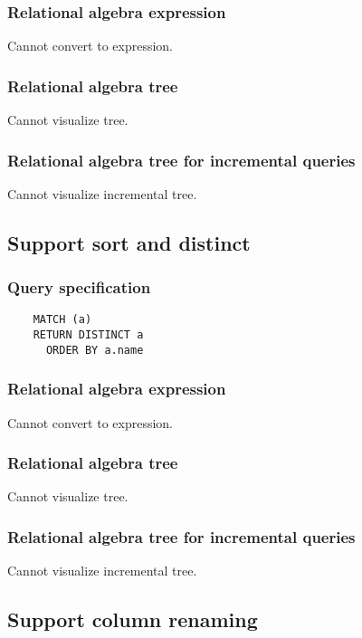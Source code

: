 	\subsubsection*{Relational algebra expression}

	Cannot convert to expression.

	\subsubsection*{Relational algebra tree}

	Cannot visualize tree.

	\subsubsection*{Relational algebra tree for incremental queries}

	Cannot visualize incremental tree.
	\subsection{Support sort and distinct}

	\subsubsection*{Query specification}

	\begin{lstlisting}
	MATCH (a)
	RETURN DISTINCT a
	  ORDER BY a.name
	\end{lstlisting}


	\subsubsection*{Relational algebra expression}

	Cannot convert to expression.

	\subsubsection*{Relational algebra tree}

	Cannot visualize tree.

	\subsubsection*{Relational algebra tree for incremental queries}

	Cannot visualize incremental tree.
	\subsection{Support column renaming}

